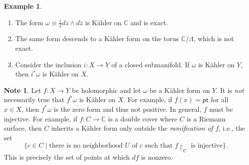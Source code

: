 \documentclass[10pt,letterpaper,cm]{nupset}
\theoremstyle{definition}
\newtheorem{exmp}[defn]{Example}
\newtheorem{note}[defn]{Note}
\theoremstyle{theorem}
\theoremstyle{remark}
\newcommand{\C}{\mathbb C}
\newcommand{\1}{\mathbb{1}}
\newcommand{\0}{\vec 0}
\newcommand{\pt}{\mathsf{pt}}
\newcommand{\be}{\begin{enumerate}}
\newcommand{\ee}{\end{enumerate}}
\begin{document}
\begin{exmp}\label{km1} $ $
\be
\item The form $\omega \equiv \frac{i}{2}d{z} \wedge d{\bar{z}}$ is K\"ahler on $\C$ and is exact.
\item The same form descends to a K\"ahler form on the torus $\C/\Lambda$, which is not exact. 
\item Consider the inclusion $i : X \to Y$ of a closed submanifold. If $\omega$ is K\"ahler on $Y$, then $i^{\ast}{\omega}$ is K\"ahler on $X$.
\ee
\end{exmp}

\begin{note}
Let $f: X \to Y$ be holomorphic and let $\omega$ be a K\"ahler form on $Y$. It is \emph{not} necessarily true that $f^{\ast}{\omega}$ is K\"ahler on $X$. For example, if $f(x) = \pt$ for all $x\in X$, then $f^{\ast}{\omega}$ is the zero form and thus not positive. 
In general,  $f$ must be injective. For example, if $f: C \to \C$ is a double cover where $C$ is a Riemann surface, then $C$ inherits a K\"ahler form only outside the  \textit{ramification of $f$}, i.e., the set $$\{c\in C \mid \text{there is no neighborhood } U \text{ of  } c \text{ such that } f\restriction_U \text{ is injective}\}.$$ This is precisely the set of points at which $d{f}$ is nonzero.
\end{note}
\end{document}
